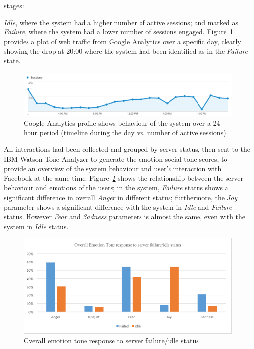 \documentclass[graybox]{svmult}
\begin{document}
stages: {\emph{Idle}, where the system had a higher number of active
sessions; and marked as {\emph{Failure}}, where the system had a lower
number of sessions engaged. Figure~\ref{fig:googleanalytics} provides
a plot of web traffic from Google Analytics over a specific day, clearly
showing the drop at 20:00 where the system had been identified as in
the {\emph{Failure}} state.

\begin{figure}[!ht]
\centering
\includegraphics[width=\columnwidth]{images/googleanalytics}
\caption{Google Analytics profile shows behaviour of the system over a
  24 hour period (timeline during the day vs. number of active sessions)}
\label{fig:googleanalytics} 
\end{figure}

All interactions had been collected and grouped by server status, then
sent to the IBM Watson Tone Analyzer to generate the emotion social
tone scores, to provide an overview of the system behaviour and user’s
interaction with Facebook at the same
time. Figure~\ref{fig:emotiontone} shows the relationship between the
server behaviour and emotions of the users; in the system,
{\emph{Failure}} status shows a significant difference in overall
{\emph{Anger}} in different status; furthermore, the {\emph{Joy}}
parameter shows a significant difference with the system in
{\emph{Idle}} and {\emph{Failure}} status. However {\emph{Fear}} and
{\emph{Sadness}} parameters is almost the same, even with the system in
{\emph{Idle}} status.

\begin{figure}[!ht]
\centering
\includegraphics[width=\columnwidth]{images/emotiontone}
\caption{Overall emotion tone response to server failure/idle status}
\label{fig:emotiontone} 
\end{figure}

}
\end{document}
